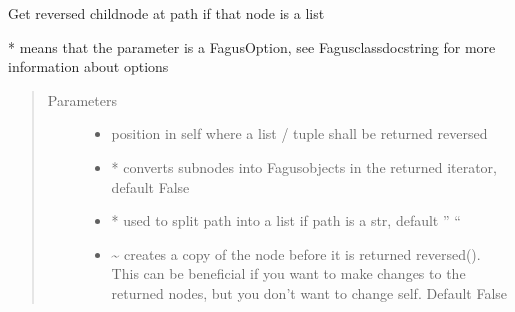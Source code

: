 \documentclass[a4paper,10pt,english]{sphinxmanual}
\begin{document}
\begin{fulllineitems}
\begin{fulllineitems}
\end{fulllineitems}


\begin{fulllineitems}
\label{\detokenize{fagus:fagus.Fagus.reversed}}
\pysigstartsignatures
{}
\pysigstopsignatures
\sphinxAtStartPar
Get reversed child\sphinxhyphen{}node at path if that node is a list

\sphinxAtStartPar
* means that the parameter is a FagusOption, see Fagus\sphinxhyphen{}class\sphinxhyphen{}docstring for more information about options
\begin{quote}\begin{description}
\item[{Parameters}] \leavevmode\begin{itemize}
\item {}
\sphinxAtStartPar
{} \textendash{} position in self where a list / tuple shall be returned reversed

\item {}
\sphinxAtStartPar
{} \textendash{} * converts sub\sphinxhyphen{}nodes into Fagus\sphinxhyphen{}objects in the returned iterator, default False

\item {}
\sphinxAtStartPar
{} \textendash{} * used to split path into a list if path is a str, default ” “

\item {}
\sphinxAtStartPar
{} \textendash{} \textasciitilde{} creates a copy of the node before it is returned reversed(). This can be beneficial if you want to
make changes to the returned nodes, but you don’t want to change self. Default False


\end{itemize}
\end{description}
\end{quote}
\end{fulllineitems}
\end{fulllineitems}
\end{document}
